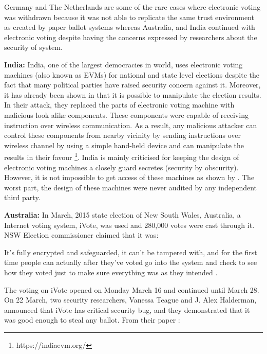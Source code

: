   
  
  Germany and The Netherlands are some of the rare cases where 
  electronic voting was withdrawn because it was not able to 
  replicate the same trust environment as created by paper 
  ballot systems whereas Australia, and India continued 
  with electronic voting despite having the concerns expressed 
  by researchers about the security of system. 
  
  \textbf{India:}
  India, one of the largest democracies in world, 
  uses electronic voting machines (also known as EVMs) for national 
  and state level  elections despite the fact that many political parties have raised security 
  concern against it. Moreover, it has already been shown in \citep{Wolchok:2010:SAI:1866307.1866309}  that it 
  is possible to manipulate the election results. In their attack, they replaced the parts 
  of electronic voting machine  with malicious look alike components. These components 
  were capable of receiving instruction over wireless communication. As a result, any malicious 
  attacker can control these components from nearby vicinity by sending 
  instructions over wireless channel by using a simple hand-held device and 
  can  manipulate the results in their favour \footnote{https://indiaevm.org/}.
  India is mainly criticised for keeping the design of electronic voting machines 
  a closely guard secretes (security by obscurity). However, it is not impossible to get access of 
  these machines as shown by \citep{Wolchok:2010:SAI:1866307.1866309}. 
  The worst part, the design of these machines were never audited by 
  any independent third party. 
  
  

 \textbf{Australia:}
  In March, 2015 state election 
  of New South Wales, Australia, a Internet voting system, iVote,    
  was used and 280,000 votes were cast through it. NSW Election 
  commissioner claimed that it was:
  
  \begin{displayquote} 
  It's fully encrypted and safeguarded, it can't be tampered with, 
 and for the first time people can actually after they've voted 
 go into the system and check to see how they voted just to make 
 sure everything was as they intended \citep{NSWelection}.
 \end{displayquote}
 

  \noindent
  The voting on iVote 
  opened on Monday March 16 and continued until March 28. On 22 March,
  two security researchers, Vanessa Teague and J. Alex Halderman, 
  announced that iVote has critical security bug, and they demonstrated 
  that it was good enough to steal any ballot. From their paper
  \citep{10.1007/978-3-319-22270-7_3}:
  

